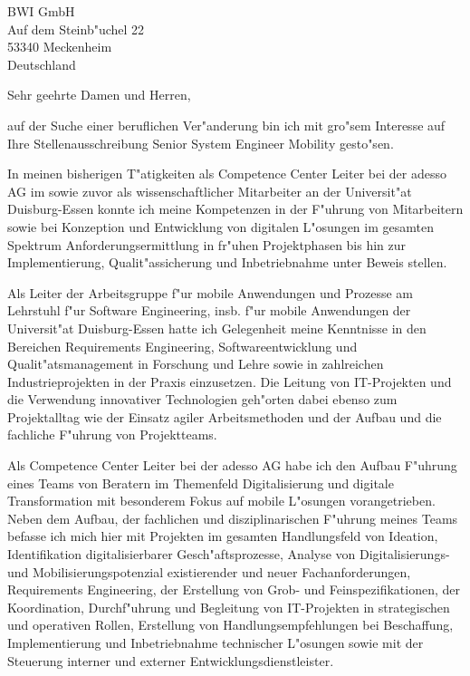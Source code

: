 \documentclass[10pt,a4paper]{dinbrief}
\date{\today}
\begin{document}
 
\begin{letter}  
{%
	BWI GmbH\\
	Auf dem Steinb"uchel 22\\
	53340 Meckenheim\\
	Deutschland
}
\subject{\bf Bewerbung Senior System Engineer Mobility}
\opening{Sehr geehrte Damen und Herren,}
auf der Suche einer beruflichen Ver"anderung bin ich mit gro"sem Interesse auf Ihre Stellenausschreibung Senior System Engineer Mobility gesto"sen. 

In meinen bisherigen T"atigkeiten als Competence Center Leiter bei der adesso AG im sowie zuvor als wissenschaftlicher Mitarbeiter an der Universit"at Duisburg-Essen konnte ich meine Kompetenzen in der F"uhrung von Mitarbeitern sowie bei Konzeption und Entwicklung von digitalen L"osungen im gesamten Spektrum Anforderungsermittlung in fr"uhen Projektphasen bis hin zur Implementierung, Qualit"assicherung und Inbetriebnahme unter Beweis stellen.

Als Leiter der Arbeitsgruppe f"ur mobile Anwendungen und Prozesse am Lehrstuhl f"ur Software Engineering, insb. f"ur mobile Anwendungen der Universit"at Duisburg-Essen hatte ich Gelegenheit meine Kenntnisse in den Bereichen Requirements Engineering, Softwareentwicklung und Qualit"atsmanagement in Forschung und Lehre sowie in zahlreichen Industrieprojekten in der Praxis einzusetzen. Die Leitung von IT-Projekten und die Verwendung innovativer Technologien geh"orten dabei ebenso zum Projektalltag wie der Einsatz agiler Arbeitsmethoden und der Aufbau und die fachliche  F"uhrung von Projektteams.

Als Competence Center Leiter bei der adesso AG habe ich den Aufbau F"uhrung eines Teams von Beratern im Themenfeld Digitalisierung und digitale Transformation mit besonderem Fokus auf mobile L"osungen vorangetrieben. Neben dem Aufbau, der fachlichen und disziplinarischen F"uhrung meines Teams befasse ich mich hier mit Projekten im gesamten Handlungsfeld von Ideation, Identifikation digitalisierbarer Gesch"aftsprozesse, Analyse von Digitalisierungs- und Mobilisierungspotenzial existierender und neuer Fachanforderungen, Requirements Engineering, der Erstellung von Grob- und Feinspezifikationen, der Koordination, Durchf"uhrung und Begleitung von IT-Projekten in strategischen und operativen Rollen, Erstellung von Handlungsempfehlungen bei Beschaffung, Implementierung und Inbetriebnahme technischer L"osungen sowie mit der Steuerung interner und externer Entwicklungsdienstleister. 


\end{letter}
\end{document}
